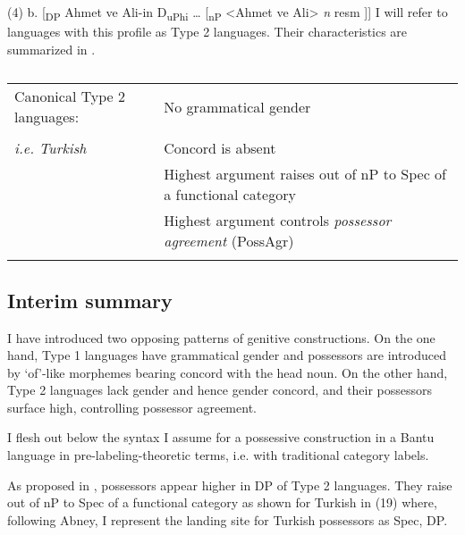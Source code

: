 \documentclass[output=paper
,modfonts
,nonflat]{langsci/langscibook}
\begin{document}
(4) b. [\textsubscript{DP} Ahmet ve Ali-in D\textsubscript{uPhi} … [\textsubscript{nP} <Ahmet ve Ali>  \textit{n} resm ]]
I will refer to languages with this profile as Type 2 languages. Their characteristics are summarized in .
\begin{table}
	\caption{}
	\label{tab:2}
	\begin{tabularx}{\textwidth}{lX}
		\lsptoprule
		Canonical Type 2 languages: &  No grammatical gender\\ \\
		\textit{i.e. Turkish}  & Concord is absent\\
		& Highest argument raises out of nP to Spec of a functional category\\
		& Highest argument controls \textit{possessor agreement} (PossAgr)\\
		\lspbottomrule
	\end{tabularx}
\end{table} \newpage \noindent
\subsection{Interim summary} 

I have introduced two opposing patterns of genitive constructions. On the one hand, Type 1 languages have grammatical gender and possessors are introduced by ‘of’-like morphemes bearing concord with the head noun. On the other hand, Type 2 languages lack gender and hence gender concord, and their possessors surface high, controlling possessor agreement. 

I flesh out below the syntax I assume for a possessive construction in a Bantu language in pre-labeling-theoretic terms, i.e. with traditional category labels.

\begin{figure}[!h]
	\begin{exe}
	\end{exe}
\end{figure}
\newpage \noindent As proposed in \citet{Abney1987}, possessors appear higher in DP of Type 2 languages. They raise out of nP to Spec of a functional category as shown for Turkish in (19) where, following Abney, I represent the landing site for Turkish possessors as Spec, DP.          
\end{document}
